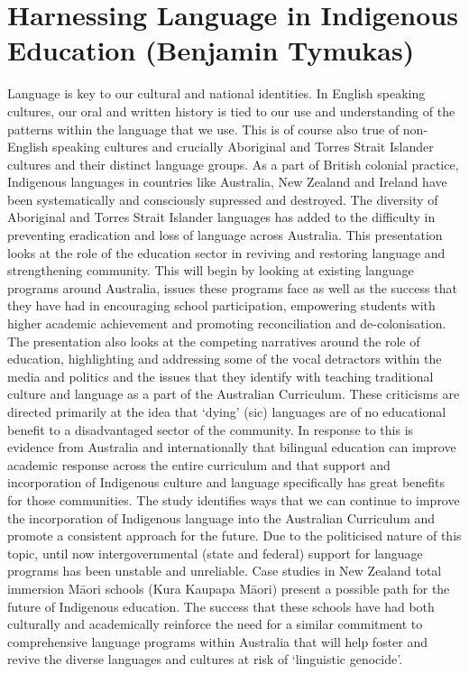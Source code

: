 \documentclass[twoside,14pt,a4paper,notitlepage]{memoir}
\begin{document}
\section*{Harnessing Language in Indigenous Education (Benjamin Tymukas)}
\label{aut:tymukas}

Language is key to our cultural and national identities. In English speaking cultures, our oral and written history is tied to our use and understanding of the patterns within the language that we use. This is of course also true of non-English speaking cultures and crucially Aboriginal and Torres Strait Islander cultures and their distinct language groups. As a part of British colonial practice, Indigenous languages in countries like Australia, New Zealand and Ireland have been systematically and consciously supressed and destroyed. The diversity of Aboriginal and Torres Strait Islander languages has added to the difficulty in preventing eradication and loss of language across Australia.
This presentation looks at the role of the education sector in reviving and restoring language and strengthening community. This will begin by looking at existing language programs around Australia, issues these programs face as well as the success that they have had in encouraging school participation, empowering students with higher academic achievement and promoting reconciliation and de-colonisation. The presentation also looks at the competing narratives around the role of education, highlighting and addressing some of the vocal detractors within the media and politics and the issues that they identify with teaching traditional culture and language as a part of the Australian Curriculum. These criticisms are directed primarily at the idea that ‘dying’ (sic) languages are of no educational benefit to a disadvantaged sector of the community. In response to this is evidence from Australia and internationally that bilingual education can improve academic response across the entire curriculum and that support and incorporation of Indigenous culture and language specifically has great benefits for those communities.
The study identifies ways that we can continue to improve the incorporation of Indigenous language into the Australian Curriculum and promote a consistent approach for the future. Due to the politicised nature of this topic, until now intergovernmental (state and federal) support for language programs has been unstable and unreliable. Case studies in New Zealand total immersion Māori schools (Kura Kaupapa Māori) present a possible path for the future of Indigenous education. The success that these schools have had both culturally and academically reinforce the need for a similar commitment to comprehensive language programs within Australia that will help foster and revive the diverse languages and cultures at risk of ‘linguistic genocide’.
\end{document}
